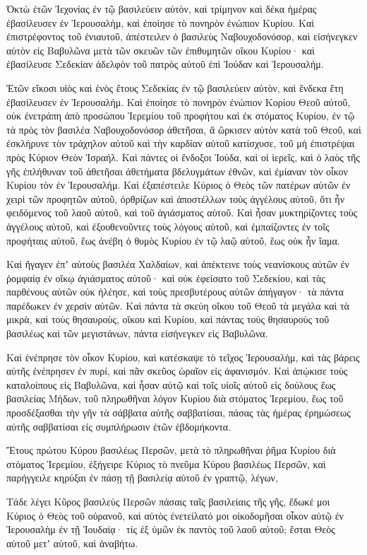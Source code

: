 {\par }{\PP {}Ὀκτὼ ἐτῶν Ἰεχονίας ἐν τῷ βασιλεύειν αὐτὸν, καὶ τρίμηνον καὶ δέκα ἡμέρας ἐβασίλευσεν ἐν Ἱερουσαλὴμ, καὶ ἐποίησε τὸ πονηρὸν ἐνώπιον Κυρίου.
Καὶ ἐπιστρέφοντος τοῦ ἐνιαυτοῦ, ἀπέστειλεν ὁ βασιλεὺς Ναβουχοδονόσορ, καὶ εἰσήνεγκεν αὐτὸν εἰς Βαβυλῶνα μετὰ τῶν σκευῶν τῶν ἐπιθυμητῶν οἴκου Κυρίου· καὶ ἐβασίλευσε Σεδεκίαν ἀδελφὸν τοῦ πατρὸς αὐτοῦ ἐπὶ Ἰούδαν καὶ Ἱερουσαλήμ.
\par }{\PP {}Ἐτῶν εἴκοσι υἱὸς καὶ ἑνὸς ἔτους Σεδεκίας ἐν τῷ βασιλεύειν αὐτὸν, καὶ ἕνδεκα ἔτη ἐβασίλευσεν ἐν Ἱερουσαλήμ.
Καὶ ἐποίησε τὸ πονηρὸν ἐνώπιον Κορίου Θεοῦ αὐτοῦ, οὐκ ἐνετράπη ἀπὸ προσώπου Ἱερεμίου τοῦ προφήτου καὶ ἐκ στόματος Κυρίου,
ἐν τῷ τὰ πρὸς τὸν βασιλέα Ναβουχοδονόσορ ἀθετῆσαι, ἃ ὥρκισεν αὐτὸν κατὰ τοῦ Θεοῦ, καὶ ἐσκλήρυνε τὸν τράχηλον αὐτοῦ καὶ τὴν καρδίαν αὐτοῦ κατίσχυσε, τοῦ μὴ ἐπιστρέψαι πρὸς Κύριον Θεὸν Ἰσραήλ.
Καὶ πάντες οἱ ἔνδοξοι Ἰούδα, καὶ οἱ ἱερεῖς, καὶ ὁ λαὸς τῆς γῆς ἐπλήθυναν τοῦ ἀθετῆσαι ἀθετήματα βδελυγμάτων ἐθνῶν, καὶ ἐμίαναν τὸν οἶκον Κυρίου τὸν ἐν Ἱερουσαλήμ.
Καὶ ἐξαπέστειλε Κύριος ὁ Θεὸς τῶν πατέρων αὐτῶν ἐν χειρὶ τῶν προφητῶν αὐτοῦ, ὀρθρίζων καὶ ἀποστέλλων τοὺς ἀγγέλους αὐτοῦ, ὅτι ἦν φειδόμενος τοῦ λαοῦ αὐτοῦ, καὶ τοῦ ἁγιάσματος αὐτοῦ.
Καὶ ἦσαν μυκτηρίζοντες τοὺς ἀγγέλους αὐτοῦ, καὶ ἐξουθενοῦντες τοὺς λόγους αὐτοῦ, καὶ ἐμπαίζοντες ἐν τοῖς προφήταις αὐτοῦ, ἕως ἀνέβη ὁ θυμὸς Κυρίου ἐν τῷ λαῷ αὐτοῦ, ἕως οὐκ ἦν ἴαμα.
\par }{\PP {}Καὶ ἤγαγεν ἐπʼ αὐτοὺς βασιλέα Χαλδαίων, καὶ ἀπέκτεινε τοὺς νεανίσκους αὐτῶν ἐν ῥομφαίᾳ ἐν οἴκῳ ἁγιάσματος αὐτοῦ· καὶ οὐκ ἐφείσατο τοῦ Σεδεκίου, καὶ τὰς παρθένους αὐτῶν οὐκ ἠλέησε, καὶ τοὺς πρεσβυτέρους αὐτῶν ἀπήγαγον· τὰ πάντα παρέδωκεν ἐν χερσὶν αὐτῶν.
Καὶ πάντα τὰ σκεύη οἴκου τοῦ Θεοῦ τὰ μεγάλα καὶ τὰ μικρὰ, καὶ τοὺς θησαυροὺς, οἴκου καὶ Κυρίου, καὶ πάντας τοὺς θησαυροὺς τοῦ βασιλέως καὶ τῶν μεγιστάνων, πάντα εἰσήνεγκεν εἰς Βαβυλῶνα.
\par }{\PP {}Καὶ ἐνέπρησε τὸν οἶκον Κυρίου, καὶ κατέσκαψε τὸ τεῖχος Ἱερουσαλὴμ, καὶ τὰς βάρεις αὐτῆς ἐνέπρησεν ἐν πυρί, καὶ πᾶν σκεῦος ὡραῖον εἰς ἀφανισμόν.
Καὶ ἀπῴκισε τοὺς καταλοίπους εἰς Βαβυλῶνα, καὶ ἦσαν αὐτῷ καὶ τοῖς υἱοῖς αὐτοῦ εἰς δούλους ἕως βασιλείας Μήδων,
τοῦ πληρωθῆναι λόγον Κυρίου διὰ στόματος Ἱερεμίου, ἕως τοῦ προσδέξασθαι τὴν γῆν τὰ σάββατα αὐτῆς σαββατίσαι, πάσας τὰς ἡμέρας ἐρημώσεως αὐτῆς σαββατίσαι εἰς συμπλήρωσιν ἐτῶν ἑβδομήκοντα.
\par }{\PP {}Ἔτους πρώτου Κύρου βασιλέως Περσῶν, μετὰ τὸ πληρωθῆναι ῥῆμα Κυρίου διὰ στόματος Ἱερεμίου, ἐξήγειρε Κύριος τὸ πνεῦμα Κύρου βασιλέως Περσῶν, καὶ παρήγγειλε κηρύξαι ἐν πάσῃ τῇ βασιλείᾳ αὐτοῦ ἑν γραπτῷ, λέγων,
\par }{\PP {}Τάδε λέγει Κῦρος βασιλεὺς Περσῶν πάσαις ταῖς βασιλείαις τῆς γῆς, ἔδωκέ μοι Κύριος ὁ Θεὸς τοῦ οὐρανοῦ, καὶ αὐτὸς ἐνετείλατό μοι οἰκοδομῆσαι οἶκον αὐτῷ ἐν Ἱερουσαλὴμ ἐν τῇ Ἰουδαίᾳ· τίς ἐξ ὑμῶν ἐκ παντὸς τοῦ λαοῦ αὐτοῦ; ἔσται Θεὸς αὐτοῦ μετʼ αὐτοῦ, καὶ ἀναβήτω.
\par }